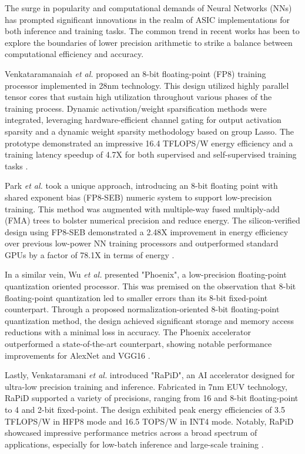 The surge in popularity and computational demands of Neural Networks (NNs) has prompted significant innovations in the realm of ASIC implementations for both inference and training tasks. The common trend in recent works has been to explore the boundaries of lower precision arithmetic to strike a balance between computational efficiency and accuracy. 

Venkataramanaiah \textit{et al.} proposed an 8-bit floating-point (FP8) training processor implemented in 28nm technology. This design utilized highly parallel tensor cores that sustain high utilization throughout various phases of the training process. Dynamic activation/weight sparsification methods were integrated, leveraging hardware-efficient channel gating for output activation sparsity and a dynamic weight sparsity methodology based on group Lasso. The prototype demonstrated an impressive 16.4 TFLOPS/W energy efficiency and a training latency speedup of 4.7X for both supervised and self-supervised training tasks \cite{venkataramanaiah202228nm}.

Park \textit{et al.} took a unique approach, introducing an 8-bit floating point with shared exponent bias (FP8-SEB) numeric system to support low-precision training. This method was augmented with multiple-way fused multiply-add (FMA) trees to bolster numerical precision and reduce energy. The silicon-verified design using FP8-SEB demonstrated a 2.48X improvement in energy efficiency over previous low-power NN training processors and outperformed standard GPUs by a factor of 78.1X in terms of energy \cite{park2021neural}.

In a similar vein, Wu \textit{et al.} presented "Phoenix", a low-precision floating-point quantization oriented processor. This was premised on the observation that 8-bit floating-point quantization led to smaller errors than its 8-bit fixed-point counterpart. Through a proposed normalization-oriented 8-bit floating-point quantization method, the design achieved significant storage and memory access reductions with a minimal loss in accuracy. The Phoenix accelerator outperformed a state-of-the-art counterpart, showing notable performance improvements for AlexNet and VGG16 \cite{wu2020phoenix}.

Lastly, Venkataramani \textit{et al.} introduced "RaPiD", an AI accelerator designed for ultra-low precision training and inference. Fabricated in 7nm EUV technology, RaPiD supported a variety of precisions, ranging from 16 and 8-bit floating-point to 4 and 2-bit fixed-point. The design exhibited peak energy efficiencies of 3.5 TFLOPS/W in HFP8 mode and 16.5 TOPS/W in INT4 mode. Notably, RaPiD showcased impressive performance metrics across a broad spectrum of applications, especially for low-batch inference and large-scale training \cite{venkataramani2021rapid}.

